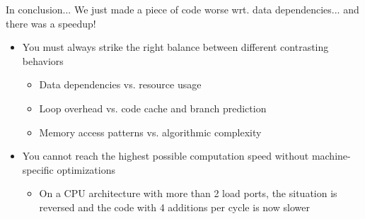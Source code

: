 \begin{frame}{In conclusion...}
We just made a piece of code \alert{worse} wrt. data dependencies... and there was a speedup!
\smallskip
\large
\begin{itemize}
\item You must always strike the right balance between different contrasting behaviors
	\begin{itemize}
	\item Data dependencies vs. resource usage
	\item Loop overhead vs. code cache and branch prediction
	\item Memory access patterns vs. algorithmic complexity
	\end{itemize}
\smallskip
\item You cannot reach the highest possible computation speed without machine-specific optimizations
	\begin{itemize}
	\item On a CPU architecture with more than 2 load ports, the situation is reversed and the code with 4 additions per cycle is now slower
	\end{itemize}
\end{itemize}
\end{frame}




